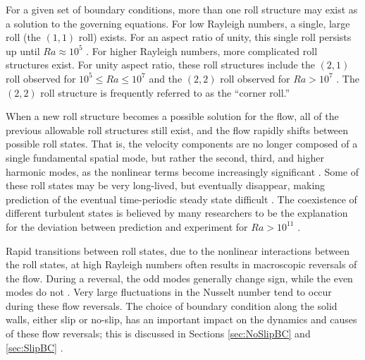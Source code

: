\documentclass[10pt]{article}
\newcounter{subsubsubsection}[subsubsection]
\numberwithin{equation}{section} %
\begin{document}
For a given set of boundary conditions, more than one roll structure may exist as a solution to the governing equations. For low Rayleigh numbers, a single, large roll (the \((1,1)\) roll) exists. For an aspect ratio of unity, this single roll persists up until \(Ra\approx10^5\) \cite{chandra}. For higher Rayleigh numbers, more complicated roll structures exist. For unity aspect ratio, these roll structures include the \((2,1)\) roll observed for \(10^5\leq Ra\leq 10^7\) and the \((2,2)\) roll observed for \(Ra>10^7\) \cite{chandra}. The \((2,2)\) roll structure is frequently referred to as the ``corner roll.''

When a new roll structure becomes a possible solution for the flow, all of the previous allowable roll structures still exist, and the flow rapidly shifts between possible roll states. That is, the velocity components are no longer composed of a single fundamental spatial mode, but rather the second, third, and higher harmonic modes, as the nonlinear terms become increasingly significant \cite{berge}. Some of these roll states may be very long-lived, but eventually disappear, making prediction of the eventual time-periodic steady state difficult \cite{poel}. The coexistence of different turbulent states is believed by many researchers to be the explanation for the deviation between prediction and experiment for \(Ra>10^{11}\) \cite{poel}.

Rapid transitions between roll states, due to the nonlinear interactions between the roll states, at high Rayleigh numbers often results in macroscopic reversals of the flow. During a reversal, the odd modes generally change sign, while the even modes do not \cite{verma,chandra}. Very large fluctuations in the Nusselt number tend to occur during these flow reversals. The choice of boundary condition along the solid walls, either slip or no-slip, has an important impact on the dynamics and causes of these flow reversals; this is discussed in Sections \ref{sec:NoSlipBC} and \ref{sec:SlipBC} \cite{verma}. 

\label{sec:NoSlipBC}
\end{document}
